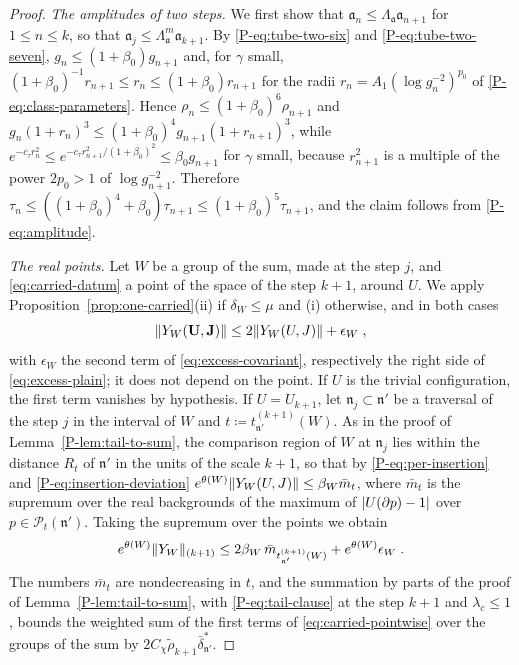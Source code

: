 \begin{proof}
\emph{The amplitudes of two steps.} We first show that $\mathfrak a_n \leq \Lambda_{\mathfrak a}\mathfrak a_{n+1}$ for $1 \leq n \leq k$, so that $\mathfrak a_j \leq \Lambda_{\mathfrak a}^m\mathfrak a_{k+1}$. By \eqref{P-eq:tube-two-six} and \eqref{P-eq:tube-two-seven}, $g_n \leq (1 + \beta_0)g_{n+1}$ and, for $\gamma$ small, $(1 + \beta_0)^{-1}r_{n+1} \leq r_n \leq (1 + \beta_0)r_{n+1}$ for the radii $r_n = A_1(\log g_n^{-2})^{p_0}$ of \eqref{P-eq:class-parameters}. Hence $\rho_n \leq (1 + \beta_0)^6\rho_{n+1}$ and $g_n(1 + r_n)^3 \leq (1 + \beta_0)^4g_{n+1}(1 + r_{n+1})^3$, while $e^{-c_\tau r_n^2} \leq e^{-c_\tau r_{n+1}^2/(1 + \beta_0)^2} \leq \beta_0g_{n+1}$ for $\gamma$ small, because $r_{n+1}^2$ is a multiple of the power $2p_0 > 1$ of $\log g_{n+1}^{-2}$. Therefore $\tau_n \leq ((1 + \beta_0)^4 + \beta_0)\tau_{n+1} \leq (1 + \beta_0)^5\tau_{n+1}$, and the claim follows from \eqref{P-eq:amplitude}.

\emph{The real points.} Let $W$ be a group of the sum, made at the step $j$, and \eqref{eq:carried-datum} a point of the space of the step $k + 1$, around $U$. We apply Proposition~\ref{prop:one-carried}(ii) if $\delta_W \leq \mu$ and (i) otherwise, and in both cases
\[
    \lVert Y_W(\mathbf U, \mathbf J)\rVert \leq 2\lVert Y_W(U, J)\rVert + \epsilon_W\;,
\]
with $\epsilon_W$ the second term of \eqref{eq:excess-covariant}, respectively the right side of \eqref{eq:excess-plain}; it does not depend on the point. If $U$ is the trivial configuration, the first term vanishes by hypothesis. If $U = U_{k+1}$, let $\mathfrak n_j \subset \mathfrak n'$ be a traversal of the step $j$ in the interval of $W$ and $t \coloneqq t^{(k+1)}_{\mathfrak n'}(W)$. As in the proof of Lemma~\ref{P-lem:tail-to-sum}, the comparison region of $W$ at $\mathfrak n_j$ lies within the distance $R_t$ of $\mathfrak n'$ in the units of the scale $k + 1$, so that by \eqref{P-eq:per-insertion} and \eqref{P-eq:insertion-deviation} $e^{\theta(W)}\lVert Y_W(U, J)\rVert \leq \beta_W\bar m_t$, where $\bar m_t$ is the supremum over the real backgrounds of the maximum of $\lvert U(\partial p) - 1\rvert$ over $p \in \mathcal P_t(\mathfrak n')$. Taking the supremum over the points we obtain
\begin{equation}\label{eq:carried-pointwise}
    e^{\theta(W)}\lVert Y_W\rVert_{(k+1)} \leq 2\beta_W\,\bar m_{t^{(k+1)}_{\mathfrak n'}(W)} + e^{\theta(W)}\epsilon_W\;.
\end{equation}
The numbers $\bar m_t$ are nondecreasing in $t$, and the summation by parts of the proof of Lemma~\ref{P-lem:tail-to-sum}, with \eqref{P-eq:tail-clause} at the step $k + 1$ and $\lambda_c \leq 1$, bounds the weighted sum of the first terms of \eqref{eq:carried-pointwise} over the groups of the sum by $2C_\chi\tilde\rho_{k+1}\bar\delta^*_{\mathfrak n'}$.


\end{proof}
